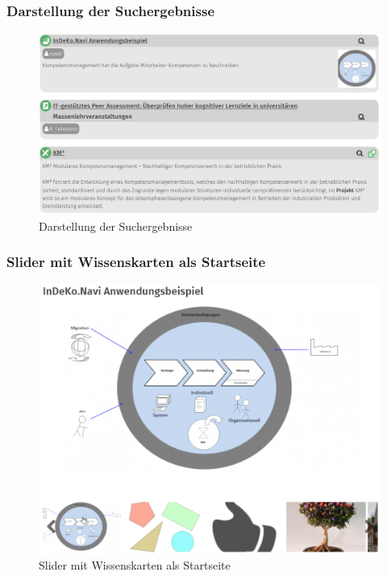 \subsubsection{Darstellung der Suchergebnisse}\label{subsub:suchergebnisse}
\begin{figure}[H]
	\centering
	\includegraphics[height=0.20\textheight]{images/example_searchresult}
	\caption{Darstellung der Suchergebnisse}
	\label{fig:example_searchresult}
\end{figure}


\subsubsection{Slider mit Wissenskarten als Startseite}\label{subsub:wkslider}
\begin{figure}[H]
	\centering
	\includegraphics[height=0.20\textheight]{images/example_slider}
	\caption{Slider mit Wissenskarten als Startseite}
	\label{fig:example_slider}
\end{figure}


